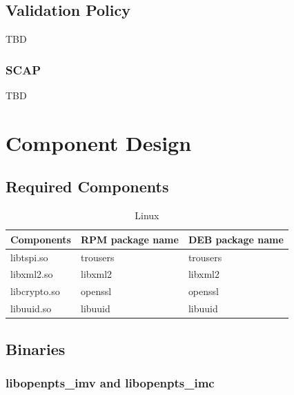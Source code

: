 \documentclass[12pt,a4paper]{article}
\begin{document}
\subsection{Validation Policy} 

TBD 


\subsubsection{SCAP} 


TBD



\clearpage 
\section{Component Design}

\subsection{Required Components}

\begin{table}
\caption{Linux}
\label{table:timeline}
\begin{center}
\begin{tabular}{|l|l|l|}
	\hline
	Components & RPM package name & DEB package name \\
	\hline 	\hline
	libtspi.so   & trousers & trousers \\ \hline
	libxml2.so   & libxml2  & libxml2  \\ \hline
	libcrypto.so & openssl  & openssl  \\ \hline
	libuuid.so   & libuuid  & libuuid  \\ \hline
\end{tabular}
\end{center}
\end{table}


\subsection{Binaries}


\subsubsection{libopenpts\_imv and libopenpts\_imc}
\end{document}
